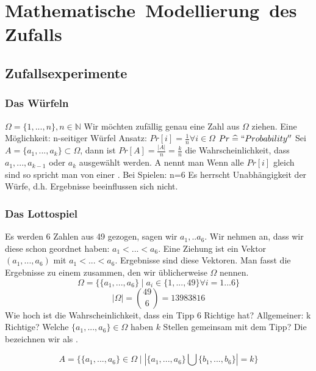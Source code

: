 
\chapter{Mathematische\ Modellierung\ des\ Zufalls}
\section{Zufallsexperimente}
\subsection{Das Würfeln}
$\Omega = \lbrace 1, ... , n  \rbrace , n \in \mathbb{N}$ Wir möchten zufällig genau eine Zahl aus $\Omega$ ziehen. Eine Möglichkeit: n-seitiger Würfel\newline
Ansatz: $Pr[i] = \frac{1}{n}  \forall i \in \Omega$\newline
$Pr \mathrel{\widehat{=}} ``Probability''$\newline
Sei $A=\lbrace a_1, ... , a_k \rbrace \subset \Omega$, dann ist $Pr[A]=\frac{\left|A\right|}{n} = \frac{k}{n}$ die Wahrscheinlichkeit, dass $a_1, ..., a_{k-1}$ oder $a_{k}$ ausgewählt werden.\newline
A nennt man \newline
Wenn alle $Pr[i]$ gleich sind so spricht man von einer .\newline
Bei Spielen: n=6
Es herrscht Unabhängigkeit der Würfe, d.h. Ergebnisse beeinflussen sich nicht.

\subsection{Das Lottospiel}
Es werden 6 Zahlen aus 49 gezogen, sagen wir $a_1, .. a_6$. Wir nehmen an, dass wir diese schon geordnet haben: $a_1 < ... < a_6$. Eine Ziehung ist ein Vektor $(a_1,...,a_6)$ mit $a_1 < ... < a_6$. Ergebnisse sind diese Vektoren. Man fasst die Ergebnisse zu einem  zusammen, den wir üblicherweise $\Omega$ nennen.
$$ \Omega = \lbrace \lbrace a_1,...,a_6 \rbrace \mid a_i \in \lbrace 1,...,49 \rbrace \forall i=1...6  \rbrace$$
$$ \left|\Omega\right| = \binom{49}{6} = 13983816$$%
Wie hoch ist die Wahrscheinlichkeit, dass ein Tipp 6 Richtige hat? Allgemeiner: k Richtige? %
Welche $\lbrace a_1,...,a_6 \rbrace \in \Omega$ haben $k$ Stellen gemeinsam mit dem Tipp? %
Die bezeichnen wir als .\newpage%

$$A = \lbrace \lbrace a_1,...,a_6 \rbrace \in \Omega \mid \left| \lbrace a_1,...,a_6 \rbrace \bigcup \lbrace b_1,...,b_6 \rbrace \right| = k \rbrace$$%

